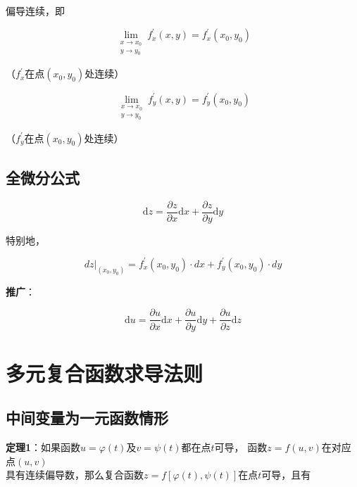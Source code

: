 \documentclass[12pt, a4paper]{article}
\numberwithin{equation}{section}
\newcommand{\rmd}{\mathrm{d}}
\begin{document}
    偏导连续，即

    $$
        \lim _{\substack{x \rightarrow x_0 \\ y \rightarrow y_0}} f_x^{\prime}(x, y)=f_x^{\prime}\left(x_0, y_0\right)
    $$

    （\(f_x^{\prime}\)在点\(\left(x_0, y_0\right)\)处连续）

    $$
        \lim _{\substack{x \rightarrow x_0 \\ y \rightarrow y_0}} f_y^{\prime}(x, y)=f_y^{\prime}\left(x_0, y_0\right)
    $$

    （\(f_y^{\prime}\)在点\(\left(x_0, y_0\right)\)处连续）

\subsection{全微分公式}

    \begin{equation}
        \rmd z=\frac{\partial z}{\partial x} \rmd x+\frac{\partial z}{\partial y} \rmd y
    \end{equation}

    特别地，

    \begin{equation}
        \left.d z\right|_{\left(x_0, y_0\right)}=
        f_x^{\prime}\left(x_0, y_0\right) \cdot d x+f_y^{\prime}\left(x_0, y_0\right) \cdot d y
    \end{equation}

    \textbf{推广}：

    \begin{equation}
        \rmd u=\frac{\partial u}{\partial x} \rmd x+\frac{\partial u}{\partial y} \rmd y+\frac{\partial u}{\partial z} \rmd z
    \end{equation}

\section{多元复合函数求导法则}

\subsection{中间变量为一元函数情形}

    \textbf{定理1}：如果函数\(u=\varphi\left(t\right)\)及\(v=\psi\left(t\right)\)都在点\(t\)可导，
    函数\(z=f\left(u,v\right)\)在对应点\(\left(u,v\right)\)\\具有连续偏导数，那么复合函数\(z=
    f\left[\varphi\left(t\right), \psi\left(t\right)\right]\)在点\(t\)可导，且有
\end{document}
